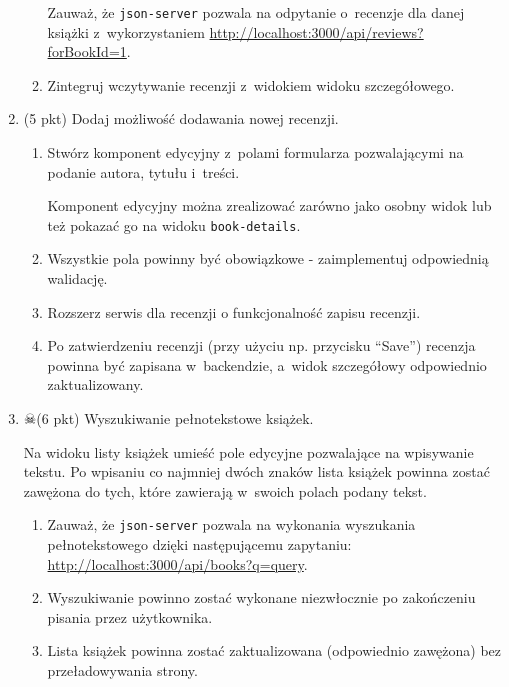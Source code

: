 \documentclass[12pt]{article}
\begin{document}
\begin{enumerate}
\begin{enumerate}
				Zauważ, że \texttt{json-server} pozwala na odpytanie o~recenzje dla danej książki z~wykorzystaniem \href{http://localhost:3000/api/reviews?forBookId=1}{http://localhost:3000/api/reviews?forBookId=1}.
				\item Zintegruj wczytywanie recenzji z~widokiem widoku szczegółowego.
			\end{enumerate}

		\item
			(5 pkt) Dodaj możliwość dodawania nowej recenzji.
			\begin{enumerate}
				\item Stwórz komponent edycyjny z~polami formularza pozwalającymi na podanie autora, tytułu i~treści.

				Komponent edycyjny można zrealizować zarówno jako osobny widok lub też pokazać go na widoku \texttt{book-details}.
				\item Wszystkie pola powinny być obowiązkowe - zaimplementuj odpowiednią walidację.
				\item Rozszerz serwis dla recenzji o funkcjonalność zapisu recenzji.
				\item Po zatwierdzeniu recenzji (przy użyciu np. przycisku ``Save'') recenzja powinna być zapisana w~backendzie, a~widok szczegółowy odpowiednio zaktualizowany.
			\end{enumerate}

		\item
			$\skull$(6 pkt) Wyszukiwanie pełnotekstowe książek.

			Na widoku listy książek umieść pole edycyjne pozwalające na wpisywanie tekstu.
			Po wpisaniu co najmniej dwóch znaków lista książek powinna zostać zawężona do tych, które zawierają w~swoich polach podany tekst.

			\begin{enumerate}
				\item Zauważ, że \texttt{json-server} pozwala na wykonania wyszukania pełnotekstowego dzięki następującemu zapytaniu: \href{http://localhost:3000/api/books?q=query}{http://localhost:3000/api/books?q=query}.

				\item Wyszukiwanie powinno zostać wykonane niezwłocznie po zakończeniu pisania przez użytkownika.

				\item Lista książek powinna zostać zaktualizowana (odpowiednio zawężona) bez przeładowywania strony.
			\end{enumerate}

    \end{enumerate}
\end{document}
